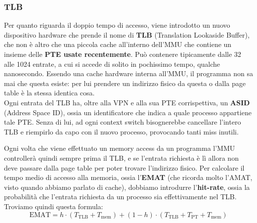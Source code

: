 \documentclass[11pt, a4paper, titlepage, oneside]{scrbook}
\begin{document}
\subsubsection*{TLB}

Per quanto riguarda il doppio tempo di accesso, viene introdotto un nuovo dispositivo hardware che prende il nome di \textbf{TLB} (Translation Lookaside Buffer), che non è altro che una piccola cache all'interno dell'MMU che contiene un insieme delle \textbf{PTE usate recentemente}. Può contenere tipicamente dalle 32 alle 1024 entrate, a cui si accede di solito in pochissimo tempo, qualche nanosecondo. Essendo una cache hardware interna all'MMU, il programma non sa mai che questa esiste: per lui prendere un indirizzo fisico da questa o dalla page table è la stessa identica cosa. \\
Ogni entrata del TLB ha, oltre alla VPN e alla sua PTE corrispettiva, un \textbf{ASID} (Address Space ID), ossia un identificatore che indica a quale processo appartiene tale PTE. Senza di lui, ad ogni context switch bisognerebbe cancellare l'intero TLB e riempirlo da capo con il nuovo processo, provocando tanti miss inutili. 

Ogni volta che viene effettuato un memory access da un programma l'MMU controllerà quindi sempre prima il TLB, e se l'entrata richiesta è lì allora non deve passare dalla page table per poter trovare l'indirizzo fisico. Per calcolare il tempo medio di accesso alla memoria, ossia l'\textbf{EMAT} (che ricorda molto l'AMAT, visto quando abbiamo parlato di cache), dobbiamo introdurre l'\textbf{hit-rate}, ossia la probabilità che l'entrata richiesta da un processo sia effettivamente nel TLB. Troviamo quindi questa formula:
\[
\text{EMAT} = h \cdot (T_{\text{TLB}} + T_{\text{mem}}) + (1-h) \cdot (T_{\text{TLB}} + T_{\text{PT}} + T_{\text{mem}})
\]
\end{document}
